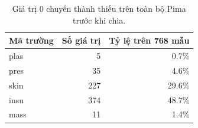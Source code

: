 \par\FloatBarrier\begin{table}[H]\centering\small{}\setlength{\tabcolsep}{5pt}
\caption{Giá trị 0 chuyển thành thiếu trên toàn bộ Pima trước khi chia.}\begin{tabular}{lrr}\toprule
Mã trường & Số giá trị & Tỷ lệ trên 768 mẫu\\\midrule
plas & 5 & 0.7\%\\
pres & 35 & 4.6\%\\
skin & 227 & 29.6\%\\
insu & 374 & 48.7\%\\
mass & 11 & 1.4\%\\\bottomrule\end{tabular}\end{table}
